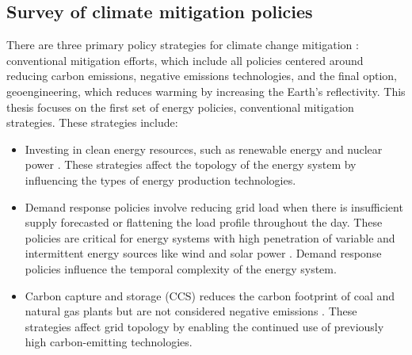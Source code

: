 \subsection{Survey of climate mitigation policies}

There are three primary policy strategies for climate change mitigation \cite{fawzy_strategies_2020}:
conventional mitigation efforts, which include all policies centered around
reducing carbon emissions, negative emissions technologies, and the final option,
geoengineering, which reduces warming by increasing the Earth’s reflectivity. This
thesis focuses on the first set of energy policies, conventional mitigation strategies.
These strategies include:
\begin{itemize}
  \item Investing in clean energy resources, such as renewable energy and nuclear power
  \cite{fawzy_strategies_2020}. These strategies affect the topology of the energy
  system by influencing the types of energy production technologies.
  \item Demand response policies involve reducing grid load when there is insufficient
  supply forecasted or flattening the load profile throughout the day. These policies
  are critical for energy systems with high penetration of variable and intermittent
  energy sources like wind and solar power \cite{bouckaert_expanding_2014,
  kuzemko_policies_2017}. Demand response policies influence the temporal
  complexity of the energy system.
  \item Carbon capture and storage (CCS) reduces the carbon footprint of coal and
  natural gas plants but are not considered negative emissions \cite{fawzy_strategies_2020}.
  These strategies affect grid topology by enabling the continued use of previously
  high carbon-emitting technologies.
\end{itemize}

